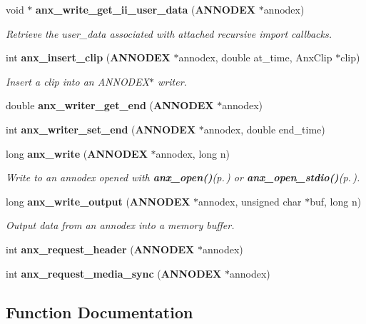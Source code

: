 \begin{CompactItemize}
void $\ast$ {\bf anx\_\-write\_\-get\_\-ii\_\-user\_\-data} ({\bf ANNODEX} $\ast$annodex)
\begin{CompactList}\small\item\em Retrieve the user\_\-data associated with attached recursive import callbacks. \item\end{CompactList}\item 
int {\bf anx\_\-insert\_\-clip} ({\bf ANNODEX} $\ast$annodex, double at\_\-time, Anx\-Clip $\ast$clip)
\begin{CompactList}\small\item\em Insert a clip into an ANNODEX$\ast$ writer. \item\end{CompactList}\item 
double {\bf anx\_\-writer\_\-get\_\-end} ({\bf ANNODEX} $\ast$annodex)\label{anx__write_8h_a8}

\item 
int {\bf anx\_\-writer\_\-set\_\-end} ({\bf ANNODEX} $\ast$annodex, double end\_\-time)\label{anx__write_8h_a9}

\item 
long {\bf anx\_\-write} ({\bf ANNODEX} $\ast$annodex, long n)
\begin{CompactList}\small\item\em Write to an annodex opened with {\bf anx\_\-open()}{\rm (p.\,\pageref{anx__general_8h_a3})} or {\bf anx\_\-open\_\-stdio()}{\rm (p.\,\pageref{anx__general_8h_a4})}. \item\end{CompactList}\item 
long {\bf anx\_\-write\_\-output} ({\bf ANNODEX} $\ast$annodex, unsigned char $\ast$buf, long n)
\begin{CompactList}\small\item\em Output data from an annodex into a memory buffer. \item\end{CompactList}\item 
int {\bf anx\_\-request\_\-header} ({\bf ANNODEX} $\ast$annodex)\label{anx__write_8h_a12}

\item 
int {\bf anx\_\-request\_\-media\_\-sync} ({\bf ANNODEX} $\ast$annodex)\label{anx__write_8h_a13}

\end{CompactItemize}


\subsection{Function Documentation}
